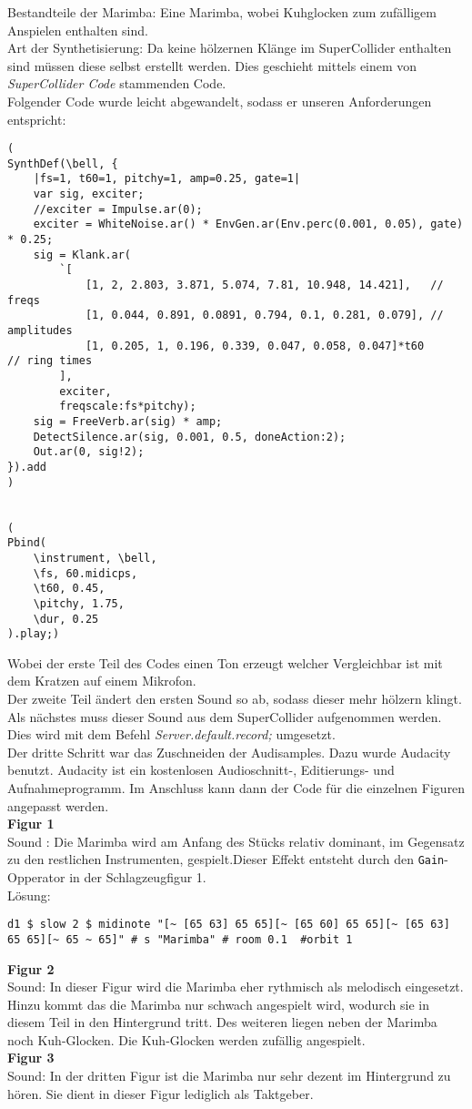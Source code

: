 \documentclass[
10pt, %
a4paper, %
oneside, %
headinclude,footinclude, %
BCOR5mm, %
]{scrartcl}
\begin{document}
\noindent Bestandteile der Marimba: Eine Marimba, wobei Kuhglocken zum zufälligem Anspielen enthalten sind.\\
Art der Synthetisierung: Da keine hölzernen Klänge im SuperCollider enthalten sind müssen diese selbst erstellt werden. Dies geschieht mittels 
einem von \textit{SuperCollider Code} stammenden Code.\cite{Marimba}\\
Folgender Code wurde leicht abgewandelt, sodass er unseren Anforderungen entspricht:
\begin{lstlisting}
(
SynthDef(\bell, {
	|fs=1, t60=1, pitchy=1, amp=0.25, gate=1|
	var sig, exciter;
	//exciter = Impulse.ar(0);
	exciter = WhiteNoise.ar() * EnvGen.ar(Env.perc(0.001, 0.05), gate) * 0.25;
	sig = Klank.ar(
		`[
			[1, 2, 2.803, 3.871, 5.074, 7.81, 10.948, 14.421],   // freqs
			[1, 0.044, 0.891, 0.0891, 0.794, 0.1, 0.281, 0.079], // amplitudes
			[1, 0.205, 1, 0.196, 0.339, 0.047, 0.058, 0.047]*t60     // ring times
		],
		exciter,
		freqscale:fs*pitchy);
	sig = FreeVerb.ar(sig) * amp;
	DetectSilence.ar(sig, 0.001, 0.5, doneAction:2);
	Out.ar(0, sig!2);
}).add
)


(
Pbind(
	\instrument, \bell,
	\fs, 60.midicps,
	\t60, 0.45,
	\pitchy, 1.75,
	\dur, 0.25
).play;)
\end{lstlisting}
Wobei der erste Teil des Codes einen Ton erzeugt welcher Vergleichbar ist mit dem Kratzen auf einem Mikrofon.\\
Der zweite Teil ändert den ersten Sound so ab, sodass dieser mehr hölzern klingt.\\
Als nächstes muss dieser Sound aus dem SuperCollider aufgenommen werden. Dies wird mit dem Befehl \textit{Server.default.record;} umgesetzt.\cite{tidcy}\\
Der dritte Schritt war das Zuschneiden der Audisamples. Dazu wurde Audacity benutzt. Audacity ist ein kostenlosen Audioschnitt-, Editierungs- und Aufnahmeprogramm.\cite{Auda} Im Anschluss kann dann der Code für die einzelnen Figuren angepasst werden.\\
		
\noindent \textbf{Figur 1}\\
Sound : Die Marimba wird am Anfang des Stücks relativ dominant, im Gegensatz zu den restlichen Instrumenten, gespielt.Dieser Effekt entsteht durch den \verb|Gain|-Opperator in der Schlagzeugfigur 1.\\
Lösung:
\begin{lstlisting}
d1 $ slow 2 $ midinote "[~ [65 63] 65 65][~ [65 60] 65 65][~ [65 63] 65 65][~ 65 ~ 65]" # s "Marimba" # room 0.1  #orbit 1
\end{lstlisting}
\noindent \textbf{Figur 2}\\
Sound: In dieser Figur wird die Marimba eher rythmisch als melodisch eingesetzt. Hinzu kommt das die Marimba nur schwach angespielt wird, wodurch sie in diesem Teil in den Hintergrund tritt. Des weiteren liegen neben der Marimba noch Kuh-Glocken. Die Kuh-Glocken werden zufällig angespielt.\\
\noindent \textbf{Figur 3}\\
Sound: In der dritten Figur ist die Marimba nur sehr dezent im Hintergrund zu hören. Sie dient in dieser Figur lediglich als Taktgeber.\\
\end{document}
